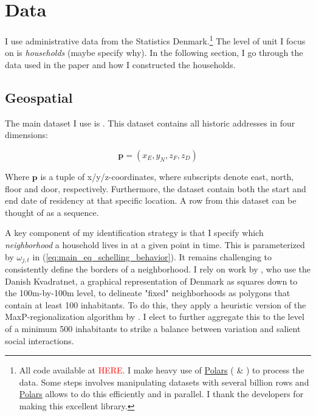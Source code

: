 \documentclass[main.tex]{subfiles}
\begin{document}
\section{Data}
\label{sec:data}
I use administrative data from the Statistics Denmark.\footnote{All code available at \textcolor{red}{HERE}. I make heavy use of \href{https://github.com/pola-rs/polars}{Polars} (\textcite{polars_ritchie_vink_2025} \& \textcite{polars_grouper_van_eechoud}) to process the data. Some steps involves manipulating datasets with several billion rows and \href{https://github.com/pola-rs/polars}{Polars} allows to do this efficiently and in parallel. I thank the developers for making this excellent library.} The level of unit I focus on is \textit{households} (maybe specify why). In the following section, I go through the data used in the paper and how I constructed the households.

\subsection{Geospatial}
\label{sec:data_geospatial}
The main dataset I use is . This dataset contains all historic addresses in four dimensions:

\begin{equation}
    \mathbf{p} = (x_E, y_N, z_F, z_D)
\end{equation}

\noindent
Where $\textbf{p}$ is a tuple of x/y/z-coordinates, where subscripts denote east, north, floor and door, respectively. Furthermore, the dataset contain both the start and end date of residency at that specific location. A row from this dataset can be thought of as a sequence.

A key component of my identification strategy is that I specify which \textit{neighborhood} a household lives in at a given point in time. This is parameterized by $\omega_{j,t}$ in (\ref{eq:main_eq_schelling_behavior}). It remains challenging to consistently define the borders of a neighborhood. I rely on work by \textcite{nabolagsatlas_neighborhoods_boje2023}, who use the Danish Kvadratnet, a graphical representation of Denmark as squares down to the 100m-by-100m level, to delineate "fixed" neighborhoods as polygons that contain at least 100 inhabitants. To do this, they apply a heuristic version of the MaxP-regionalization algorithm by \textcite{maxp_heuristic_wei2021efficient}. I elect to further aggregate this to the level of a minimum 500 inhabitants to strike a balance between variation and salient social interactions. 
\end{document}
